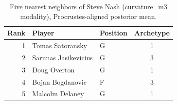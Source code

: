 \begin{table}[htbp]
  \centering\small
  \begin{tabular}{rllc}
    \toprule
    Rank & Player & Position & Archetype \\
    \midrule
    1 & Tomas Satoransky & G & 1 \\
    2 & Sarunas Jasikevicius & G & 3 \\
    3 & Doug Overton & G & 1 \\
    4 & Bojan Bogdanovic & F & 3 \\
    5 & Malcolm Delaney & G & 1 \\
    \bottomrule
  \end{tabular}
  \caption{Five nearest neighbors of Steve Nash (curvature_m3 modality), Procrustes-aligned posterior mean.}
  \label{tab:Steve_Nash_neighbors_curvature_m3}
\end{table}

